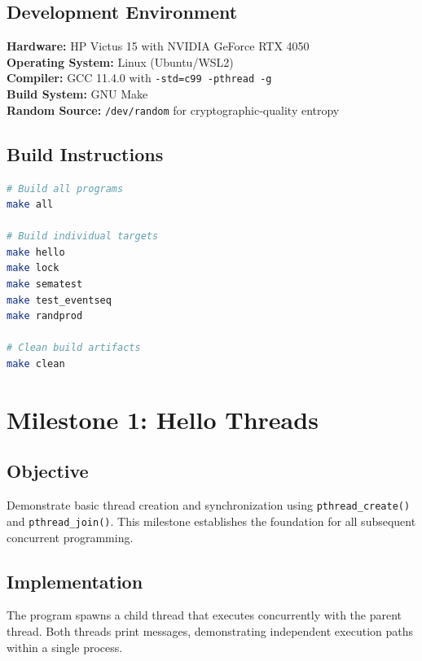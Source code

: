 \documentclass[12pt,a4paper]{article}
\begin{document}
\subsection{Development Environment}
\begin{tcolorbox}[colback=blue!5!white,colframe=blue!75!black,title=System Configuration]
\textbf{Hardware:} HP Victus 15 with NVIDIA GeForce RTX 4050 \\
\textbf{Operating System:} Linux (Ubuntu/WSL2) \\
\textbf{Compiler:} GCC 11.4.0 with \texttt{-std=c99 -pthread -g} \\
\textbf{Build System:} GNU Make \\
\textbf{Random Source:} \texttt{/dev/random} for cryptographic-quality entropy
\end{tcolorbox}

\subsection{Build Instructions}
\begin{lstlisting}[language=bash, caption={Compilation and Execution Commands}]
# Build all programs
make all

# Build individual targets
make hello
make lock
make sematest
make test_eventseq
make randprod

# Clean build artifacts
make clean
\end{lstlisting}

\clearpage

\section{Milestone 1: Hello Threads}

\subsection{Objective}
Demonstrate basic thread creation and synchronization using \texttt{pthread\_create()} and \texttt{pthread\_join()}. This milestone establishes the foundation for all subsequent concurrent programming.

\subsection{Implementation}
The program spawns a child thread that executes concurrently with the parent thread. Both threads print messages, demonstrating independent execution paths within a single process.
\end{document}
